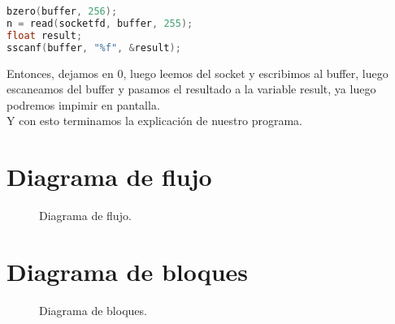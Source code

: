 \documentclass{article}
\begin{document}
\begin{lstlisting}[language=C]
bzero(buffer, 256);
n = read(socketfd, buffer, 255);
float result;
sscanf(buffer, "%f", &result);
\end{lstlisting}

Entonces, dejamos en 0, luego leemos del socket y escribimos al buffer, luego escaneamos del buffer y pasamos el resultado a la variable result, ya luego podremos impimir en pantalla.\\ 
Y con esto terminamos la explicación de nuestro programa.

\section{Diagrama de flujo}
\begin{figure}[H]
\centering
\caption{Diagrama de flujo.}
\end{figure}
\section{Diagrama de bloques}
\begin{figure}[h!]
\centering
\caption{Diagrama de bloques.}
\end{figure}
\newpage


\end{document}
